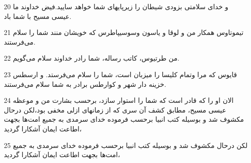 \par 20 و خدای سلامتی بزودی شیطان را زیرپایهای شما خواهد سایید.فیض خداوند ما عیسی مسیح با شما باد.
\par 21 تیموتاوس همکار من و لوقا و یاسون وسوسیپاطرس که خویشان منند شما را سلام می‌فرستند.
\par 22 من طرتیوس، کاتب رساله، شما رادر خداوند سلام می‌گویم.
\par 23 قایوس که مرا وتمام کلیسا را میزبان است، شما را سلام می‌فرستد. و ارسطس خزینه دار شهر و کوارطس برادر به شما سلام می‌فرستند.
\par 24 الان او را که قادر است که شما را استوار سازد، برحسب بشارت من و موعظه عیسی مسیح، مطابق کشف آن سری که از زمانهای ازلی مخفی بود،لکن درحال مکشوف شد و بوسیله کتب انبیا برحسب فرموده خدای سرمدی به جمیع امت‌ها بجهت اطاعت ایمان آشکارا گردید،
\par 25 لکن درحال مکشوف شد و بوسیله کتب انبیا برحسب فرموده خدای سرمدی به جمیع امت‌ها بجهت اطاعت ایمان آشکارا گردید،


